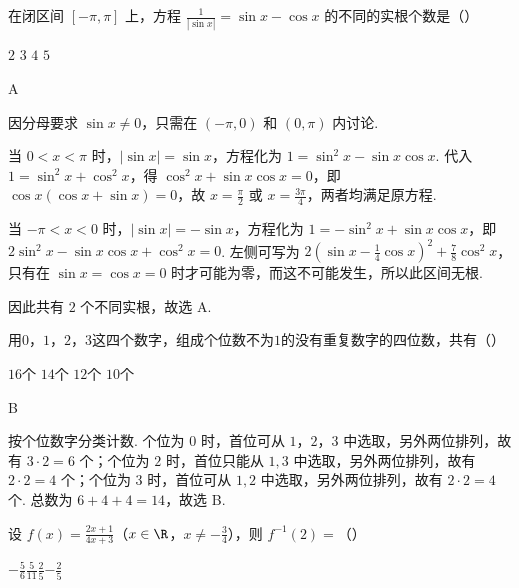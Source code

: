 \documentclass[UTF8,a4paper,oneside,11pt]{ctexbook}
\begin{document}
\begin{problem}

在闭区间 \([-\pi, \pi] \) 上，方程 \(\frac{1}{|\sin x|} = \sin x - \cos x \) 的不同的实根个数是（\quad）

\choices
{\(2\)}
{\(3\)}
{\(4\)}
{\(5\)}
\end{problem}

\begin{answer}
A
\end{answer}

\begin{solution}
因分母要求 \(\sin x\neq0\)，只需在 \((-\pi,0)\) 和 \((0,\pi)\) 内讨论.

当 \(0<x<\pi\) 时，\(|\sin x|=\sin x\)，方程化为
\(1=\sin^{2}x-\sin x\cos x\). 代入 \(1=\sin^{2}x+\cos^{2}x\)，得 \(\cos^{2}x+\sin x\cos x=0\)，即 \(\cos x(\cos x+\sin x)=0\)，故 \(x=\frac{\pi}{2}\) 或 \(x=\frac{3\pi}{4}\)，两者均满足原方程.

当 \(-\pi<x<0\) 时，\(|\sin x|=-\sin x\)，方程化为
\(1=-\sin^{2}x+\sin x\cos x\)，即
\(2\sin^{2}x-\sin x\cos x+\cos^{2}x=0\). 左侧可写为 \(2\left(\sin x-\frac{1}{4}\cos x\right)^{2}+\frac{7}{8}\cos^{2}x\)，只有在 \(\sin x=\cos x=0\) 时才可能为零，而这不可能发生，所以此区间无根.

因此共有 \(2\) 个不同实根，故选 A.
\end{solution}

\begin{problem}

用\(0\)，\(1\)，\(2\)，\(3\)这四个数字，组成个位数不为\(1\)的没有重复数字的四位数，共有（\quad）

\choices
{\(16\)个}
{\(14\)个}
{\(12\)个}
{\(10\)个}
\end{problem}

\begin{answer}
B
\end{answer}

\begin{solution}
按个位数字分类计数. 个位为 \(0\) 时，首位可从 \(1\)，\(2\)，\(3\) 中选取，另外两位排列，故有 \(3\cdot2=6\) 个；个位为 \(2\) 时，首位只能从 \(1,3\) 中选取，另外两位排列，故有 \(2\cdot2=4\) 个；个位为 \(3\) 时，首位可从 \(1,2\) 中选取，另外两位排列，故有 \(2\cdot2=4\) 个. 总数为 \(6+4+4=14\)，故选 B.
\end{solution}

\begin{problem}

设 \(f(x)=\frac{2x+1}{4x+3}\)（\(x\in\R\)，\(x\neq-\frac{3}{4}\)），则 \(f^{-1}(2)=\)（\quad）

\choices
{\(-\frac{5}{6}\)}{\(\frac{5}{11}\)}{\(\frac{2}{5}\)}{\(-\frac{2}{5}\)}
\end{problem}
\end{document}
